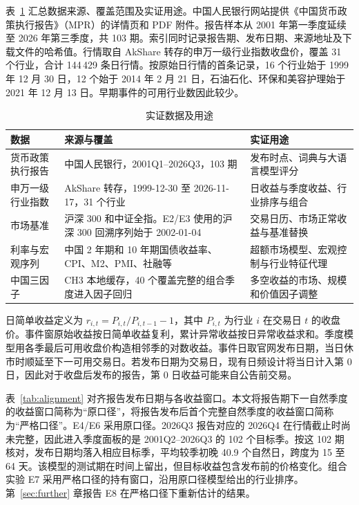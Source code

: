 表~\ref{tab:datasets} 汇总数据来源、覆盖范围及实证用途。中国人民银行网站提供《中国货币政策执行报告》（MPR）的详情页和 PDF 附件\cite{pbocMpr}。报告样本从 2001 年第一季度延续至 2026 年第三季度，共 103 期。索引同时记录报告期、发布日期、来源地址及下载文件的哈希值。行情取自 AkShare 转存的申万一级行业指数收盘价，覆盖 31 个行业，合计 144\,429 条日行情。按原始日行情的首条记录，16 个行业始于 1999 年 12 月 30 日，12 个始于 2014 年 2 月 21 日，石油石化、环保和美容护理始于 2021 年 12 月 13 日。早期事件的可用行业数因此较少。

\begin{table}[htbp]
  \centering\small
  \caption{实证数据及用途}
  \label{tab:datasets}
  \begin{tabularx}{\linewidth}{@{}p{.22\linewidth} X X@{}}
    \toprule
    数据 & 来源与覆盖 & 实证用途 \\
    \midrule
    货币政策执行报告 & 中国人民银行，2001Q1--2026Q3，103 期 & 发布时点、词典与大语言模型评分 \\
    申万一级行业指数 & AkShare 转存，1999-12-30 至 2026-11-17，31 个行业 & 日收益与季度收益、行业排序与组合 \\
    市场基准 & 沪深 300 和中证全指。E2/E3 使用的沪深 300 回溯序列始于 2002-01-04 & 交易日历、市场正常收益与基准替换 \\
    利率与宏观序列 & 中国 2 年期和 10 年期国债收益率、CPI、M2、PMI、社融等 & 超额市场模型、宏观控制与行业特征代理 \\
    中国三因子 & CH3 本地缓存，40 个覆盖完整的组合季度进入因子回归 & 多空收益的市场、规模和价值因子调整 \\
    \bottomrule
  \end{tabularx}
\end{table}

日简单收益定义为 $r_{i,t}=P_{i,t}/P_{i,t-1}-1$，其中 $P_{i,t}$ 为行业 $i$ 在交易日 $t$ 的收盘价。事件窗原始收益按日简单收益复利，累计异常收益按日异常收益求和。季度模型用各季最后可用收盘价构造相邻季的对数收益。事件日取官网发布日期，当日休市时顺延至下一可用交易日。若发布日期为交易日，现有日频设计将当日计入第 0 日，因此对于收盘后发布的报告，第 0 日收益可能来自公告前交易。

表~\ref{tab:alignment} 对齐报告发布日期与各收益窗口。本文将报告期下一自然季度的收益窗口简称为“原口径”，将报告发布后首个完整自然季度的收益窗口简称为“严格口径”。E4/E6 采用原口径。2026Q3 报告对应的 2026Q4 在行情截止时尚未完整，因此进入季度面板的是 2001Q2--2026Q3 的 102 个目标季。按这 102 期核对，发布日期均落入相应目标季，平均较季初晚 40.9 个自然日，跨度为 15 至 64 天。该模型的测试期在时间上留出，但目标收益包含发布前的价格变化。组合实验 E7 采用严格口径的持有窗口，沿用原口径模型给出的行业排序。第~\ref{sec:further} 章报告 E8 在严格口径下重新估计的结果。

